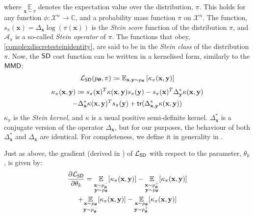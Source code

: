 \noindent where $\underset{\mathbf{x}\sim \pi}{\mathbb{E}}$ denotes the expectation value over the distribution, $\pi$. This holds for any function $\phi: \mathcal{X}^n\rightarrow \mathbb{C}$, and a probability mass function $\pi$ on $\mathcal{X}^n$. The function, $s_\pi(\mathbf{x}) = \Delta_\mathbf{x}\log(\pi(\mathbf{x}))$ is the \textit{Stein score} function of the distribution $\pi$, and $\mathcal{A}_\pi$ is a so-called \textit{Stein operator} of $\pi$. The functions that obey, \eqref{complexdiscretesteinidentity}, are said to be in the \textit{Stein class} of the distribution $\pi$.  Now, the $\operatorname{\textsf{SD}}$ cost function can be written in a kernelised form\cite{liu_kernelized_2016, yang_goodness--fit_2018}, similarly to the $\operatorname{\textsf{MMD}}$:
\begin{align}
    \mathcal{L}_{\operatorname{\textsf{SD}}}(p_{\boldsymbol\theta}, \pi)\coloneqq \mathbb{E}_{\mathbf{x}, \mathbf{y}\sim p_{\boldsymbol\theta}}\left[\kappa_\pi(\mathbf{x}, \mathbf{y})\right]\label{steindiscrepancybornmachine}
\end{align}
\begin{multline}
    \kappa_\pi(\mathbf{x}, \mathbf{y}) \coloneqq s_\pi(\mathbf{x})^T\kappa(\mathbf{x}, \mathbf{y})s_\pi(\mathbf{y}) -s_\pi(\mathbf{x})^T\Delta_{\mathbf{y}}^*\kappa(\mathbf{x}, \mathbf{y}) \\
    - \Delta_{\mathbf{x}}^*\kappa(\mathbf{x}, \mathbf{y})^Ts_\pi(\mathbf{y}) + \textsf{tr}(\Delta_{\mathbf{x}, \mathbf{y}}^*\kappa(\mathbf{x}, \mathbf{y})) \label{weightedkernelbornmachine}
\end{multline}
$\kappa_\pi$ is the \textit{Stein kernel}, and $\kappa$ is a usual positive semi-definite kernel. $\Delta_{\mathbf{x}}^*$ is a conjugate version of the operator $\Delta_{\mathbf{x}}$, but for our purposes, the behaviour of both $\Delta_{\mathbf{x}}^*$ and $\Delta_{\mathbf{x}}$ are identical. For completeness, we define it in generality in .

Just as above, the gradient (derived in ) of $\mathcal{L}_{\operatorname{\textsf{SD}}}$ with respect to the parameter, $\theta_k$, is given by:
\begin{multline}
    \frac{\partial \mathcal{L}_{\operatorname{\textsf{SD}}}}{\partial \theta_k} = \underset{\substack{\mathbf{x} \sim p^-_{\boldsymbol\theta} \\ \mathbf{y}\sim p_{\boldsymbol\theta}}}{\mathbb{E}}[\kappa_\pi(\mathbf{x}, \mathbf{y})] - \underset{\substack{\mathbf{x} \sim p^+_{\boldsymbol\theta} \\ \mathbf{y}\sim p_{\boldsymbol\theta}}}{\mathbb{E}}[\kappa_\pi(\mathbf{x}, \mathbf{y})]\\ +\underset{\substack{\mathbf{x} \sim p_{\boldsymbol\theta}\\ \mathbf{y}\sim p^-_{\boldsymbol\theta}}}{\mathbb{E}}[\kappa_\pi(\mathbf{x}, \mathbf{y})] - \underset{\substack{\mathbf{x} \sim p_{\boldsymbol\theta} \\ \mathbf{y}\sim p^+_{\boldsymbol\theta}}}{\mathbb{E}}[\kappa_\pi(\mathbf{x}, \mathbf{y})] \label{steingradient}
\end{multline}

